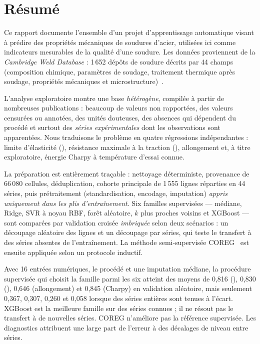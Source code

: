 \section*{Résumé}

Ce rapport documente l'ensemble d'un projet d'apprentissage automatique visant
à prédire des propriétés mécaniques de soudures d'acier, utilisées ici comme
indicateurs mesurables de la \og qualité \fg{} d'une soudure. Les données
proviennent de la \emph{Cambridge Weld Database} : 1\,652 dépôts de soudure
décrits par 44 champs (composition chimique, paramètres de soudage, traitement
thermique après soudage, propriétés mécaniques et microstructure)~\cite{cool_welddb}.

L'analyse exploratoire montre une base \emph{hétérogène}, compilée à partir de
nombreuses publications : beaucoup de valeurs non rapportées, des valeurs
censurées ou annotées, des unités douteuses, des absences qui dépendent du
procédé et surtout des \emph{séries expérimentales} dont les observations sont
apparentées. Nous traduisons le problème en quatre régressions indépendantes :
limite d'élasticité (\YS), résistance maximale à la traction (\UTS),
allongement et, à titre exploratoire, énergie Charpy à température d'essai connue.

La préparation est entièrement traçable : nettoyage déterministe, provenance de
66\,080 cellules, déduplication, cohorte principale de 1\,555 lignes réparties
en 44 séries, puis prétraitement (standardisation, encodage, imputation)
\emph{appris uniquement dans les plis d'entraînement}. Six familles supervisées
--- médiane, Ridge, SVR à noyau RBF, forêt aléatoire, $k$ plus proches voisins et
XGBoost --- sont comparées par validation croisée \emph{imbriquée} selon deux scénarios :
un découpage aléatoire des lignes et un découpage par séries, qui teste le
transfert à des séries absentes de l'entraînement. La méthode semi-supervisée
COREG~\cite{zhou_li_2005} est ensuite appliquée selon un protocole inductif.

Avec 16 entrées numériques, le procédé et une imputation médiane, la procédure
supervisée qui choisit la famille parmi les six atteint des \Rdeux{} moyens de
0,816 (\YS), 0,830 (\UTS), 0,646 (allongement) et 0,845 (Charpy) en validation
aléatoire, mais seulement 0,367, 0,307, 0,260 et 0,058 lorsque des séries entières
sont tenues à l'écart. XGBoost est la meilleure famille sur des séries connues ;
il ne résout pas le transfert à de nouvelles séries. COREG n'améliore pas la
référence supervisée. Les diagnostics attribuent une large part de l'erreur à des
décalages de niveau entre séries.

